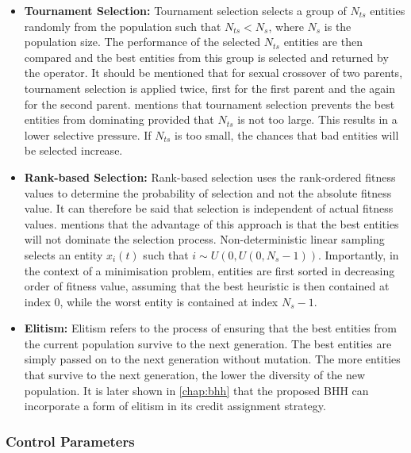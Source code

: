 \begin{itemize}
    \item \textbf{Tournament Selection: } Tournament selection selects a group of $N_{ts}$ entities randomly from the population such that $N_{ts} < N_{s}$, where $N_{s}$ is the population size. The performance of the selected $N_{ts}$ entities are then compared and the best entities from this group is selected and returned by the operator. It should be mentioned that for sexual crossover of two parents, tournament selection is applied twice, first for the first parent and the again for the second parent. \citeauthor{ref:engelbrecht:2007}\cite{ref:engelbrecht:2007} mentions that tournament selection prevents the best entities from dominating provided that $N_{ts}$ is not too large. This results in a lower selective pressure. If $N_{ts}$ is too small, the chances that bad entities will be selected increase.
    
    \item \textbf{Rank-based Selection: } Rank-based selection uses the rank-ordered fitness values to determine the probability of selection and not the absolute fitness value. It can therefore be said that selection is independent of actual fitness values. \citeauthor{ref:engelbrecht:2007}\cite{ref:engelbrecht:2007} mentions that the advantage of this approach is that the best entities will not dominate the selection process. Non-deterministic linear sampling selects an entity $x_{i}(t)$ such that $i \sim U(0, U(0, N_{s} - 1))$. Importantly, in the context of a minimisation problem, entities are first sorted in decreasing order of fitness value, assuming that the best heuristic is then contained at index 0, while the worst entity is contained at index $N_{s} - 1$. 
    
    \item \textbf{Elitism: } Elitism refers to the process of ensuring that the best entities from the current population survive to the next generation. The best entities are simply passed on to the next generation without mutation. The more entities that survive to the next generation, the lower the diversity of the new population. It is later shown in \ref{chap:bhh} that the proposed \ac{BHH} can incorporate a form of elitism in its credit assignment strategy.
\end{itemize}


\subsubsection{Control Parameters}
\label{sec:heuristics:mh:ga:control_parameters}

